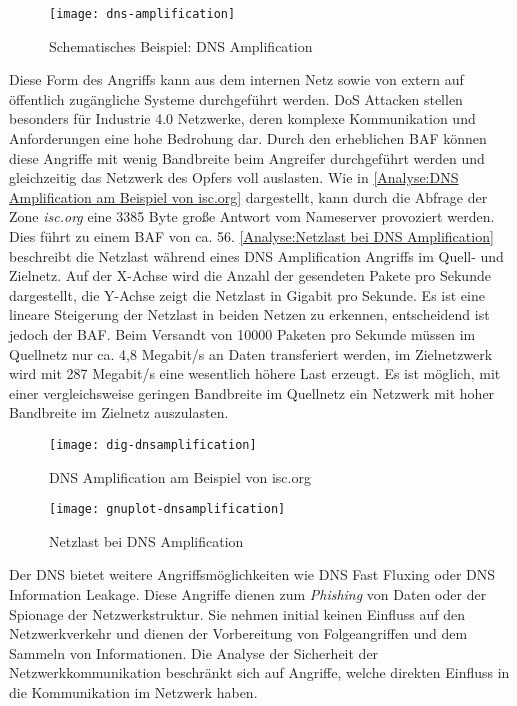 \begin{figure}[h]
    \centering
    \texttt{[image: dns-amplification]}
    \caption{Schematisches Beispiel: DNS Amplification}
    \label{Analyse:DNS Amplification Beispiel}
  \end{figure}
  
\clearpage

Diese Form des Angriffs kann aus dem internen Netz sowie von extern auf öffentlich zugängliche Systeme durchgeführt werden. \ac{DoS} Attacken stellen besonders für Industrie 4.0 Netzwerke, deren komplexe Kommunikation und Anforderungen eine hohe Bedrohung dar. Durch den erheblichen \ac{BAF} können diese Angriffe mit wenig Bandbreite beim Angreifer durchgeführt werden und gleichzeitig das Netzwerk des Opfers voll auslasten. Wie in \autoref{Analyse:DNS Amplification am Beispiel von isc.org} dargestellt, kann durch die Abfrage der Zone \textit{isc.org} eine 3385 Byte große Antwort vom Nameserver provoziert werden. Dies führt zu einem \ac{BAF} von ca. 56. \autoref{Analyse:Netzlast bei DNS Amplification} beschreibt die Netzlast während eines \ac{DNS} Amplification Angriffs im Quell- und Zielnetz. Auf der X-Achse wird die Anzahl der gesendeten Pakete pro Sekunde dargestellt, die Y-Achse zeigt die Netzlast in Gigabit pro Sekunde. Es ist eine lineare Steigerung der Netzlast in beiden Netzen zu erkennen, entscheidend ist jedoch der \ac{BAF}. Beim Versandt von 10000 Paketen pro Sekunde müssen im Quellnetz nur ca. 4,8 Megabit/s an Daten transferiert werden, im Zielnetzwerk wird mit 287 Megabit/s eine wesentlich höhere Last erzeugt. Es ist möglich, mit einer vergleichsweise geringen Bandbreite im Quellnetz ein Netzwerk mit hoher Bandbreite im Zielnetz auszulasten.

\begin{figure}[h]
    \centering
    \texttt{[image: dig-dnsamplification]}
    \caption{DNS Amplification am Beispiel von isc.org}
    \label{Analyse:DNS Amplification am Beispiel von isc.org}
\end{figure}

\begin{figure}[h]
    \centering
    \texttt{[image: gnuplot-dnsamplification]}
    \caption{Netzlast bei DNS Amplification}
    \label{Analyse:Netzlast bei DNS Amplification}
\end{figure}
  
\clearpage

Der \ac{DNS} bietet weitere Angriffsmöglichkeiten wie \ac{DNS} Fast Fluxing oder \ac{DNS} Information Leakage. Diese Angriffe dienen zum \textit{Phishing} von Daten oder der Spionage der Netzwerkstruktur. Sie nehmen initial keinen Einfluss auf den Netzwerkverkehr und dienen der Vorbereitung von Folgeangriffen und dem Sammeln von Informationen. Die Analyse der Sicherheit der Netzwerkkommunikation beschränkt sich auf Angriffe, welche direkten Einfluss in die Kommunikation im Netzwerk haben.


